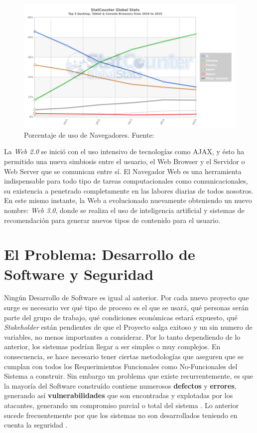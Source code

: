     \begin{figure}[h]
        \centering
        \includegraphics[width=1\textwidth]{figures/StatCounter-browser-ww-yearly-2010-2015.png}
        \caption{Porcentaje de uso de Navegadores. Fuente: \cite{statBrow}}
        \label{fig:UsageShare}
    \end{figure}

La \textit{Web 2.0} se inició con el uso intensivo de tecnologías como AJAX, y ésto ha permitido una nueva simbiosis entre el usuario, el Web Browser y el Servidor o Web Server que se comunican entre sí. El Navegador Web es una herramienta indispensable para todo tipo de tareas computacionales como comunicacionales, su existencia a penetrado completamente en las labores diarias de todos nosotros. En este mismo instante, la Web a evolucionado nuevamente obteniendo un nuevo nombre: \textit{Web 3.0}, donde se realiza el uso de inteligencia artificial y sistemas de recomendación para generar nuevos tipos de contenido para el usuario.


\section{El Problema: Desarrollo de Software y Seguridad}
\label{chap1:SD_SS}

Ningún Desarrollo de Software es igual al anterior. Por cada nuevo proyecto que surge es necesario ver qué tipo de proceso es el que se usará, qué personas serán parte del grupo de trabajo, qué condiciones económicas estará expuesto, qué \textit{Stakeholder} están pendientes de que el Proyecto salga exitoso y un sin numero de variables, no menos importantes a considerar. Por lo tanto dependiendo de lo anterior, los sistemas podrían llegar a ser simples o muy complejos. En consecuencia, se hace necesario tener ciertas metodologías que aseguren que se cumplan con todos los Requerimientos Funcionales como No-Funcionales del Sistema a construir. Sin embargo un problema que existe recurrentemente, es que la mayoría del Software construído contiene numerosos \textbf{defectos} y \textbf{errores}, generando así \textbf{vulnerabilidades} que son encontradas y explotadas por los atacantes, generando un compromiso parcial o total del sistema \cite{goertzel2007software}. Lo anterior sucede frecuentemente por que los sistemas no son desarrollados teniendo en cuenta la seguridad \cite{Yoder1998, fernandez2004methodology, WhyteHarrison}.

